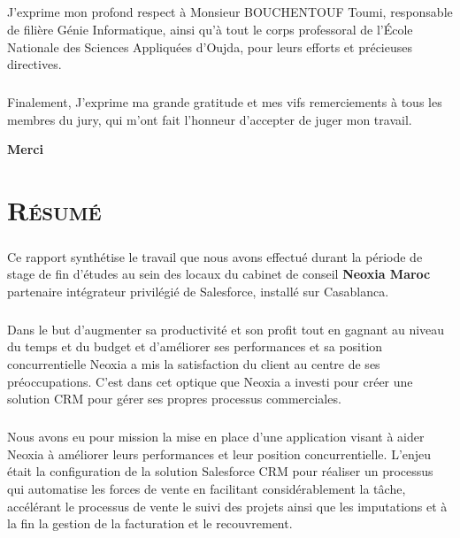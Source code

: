 \documentclass[a4paper, 12pt]{report}
\begin{document}
\begin{center}
 \paragraph{}
J'exprime mon profond respect à Monsieur BOUCHENTOUF Toumi, responsable de filière Génie Informatique, ainsi qu'à tout le corps professoral de l'École Nationale des Sciences Appliquées d'Oujda, pour leurs efforts et précieuses directives. 
 \paragraph{}
Finalement, J'exprime ma grande gratitude et mes vifs remerciements à tous les membres du jury, qui m'ont fait l'honneur d'accepter de juger mon travail.

\begin{flushleft}
\textbf{Merci}
\end{flushleft}
\end{center}



\chapter*{\textsc{Résumé}}

 \paragraph{}
Ce rapport synthétise le travail que nous avons effectué durant la période de stage de fin d'études au sein des locaux du cabinet de conseil \textbf{Neoxia Maroc} partenaire intégrateur privilégié de Salesforce, installé sur Casablanca.
 \paragraph{}
Dans le but d'augmenter sa productivité et son profit tout en gagnant au niveau du temps et du budget et d'améliorer ses performances et sa position concurrentielle Neoxia a mis la satisfaction du client au centre de ses préoccupations.
 C'est dans cet optique que Neoxia a investi pour créer une solution CRM pour gérer ses propres processus commerciales.
 
 \paragraph{}
Nous avons eu pour mission la mise en place d'une application visant à aider Neoxia à améliorer leurs performances et leur position concurrentielle. L'enjeu était la configuration de la solution Salesforce CRM pour réaliser un processus qui automatise les forces de vente en facilitant considérablement la tâche, accélérant le processus de vente le suivi des projets ainsi que les imputations et à la fin la gestion de la facturation et le recouvrement. 
\end{document}
